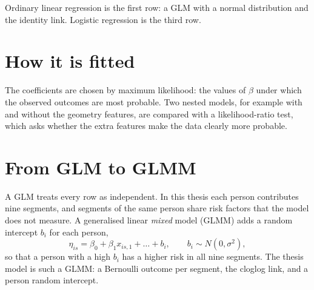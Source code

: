 \documentclass[11pt]{article}
\begin{document}
Ordinary linear regression is the first row: a GLM with a normal
distribution and the identity link. Logistic regression is the third row.

\section*{How it is fitted}

The coefficients are chosen by maximum likelihood: the values of $\beta$
under which the observed outcomes are most probable. Two nested models, for
example with and without the geometry features, are compared with a
likelihood-ratio test, which asks whether the extra features make the data
clearly more probable.

\section*{From GLM to GLMM}

A GLM treats every row as independent. In this thesis each person contributes
nine segments, and segments of the same person share risk factors that the
model does not measure. A generalised linear \emph{mixed} model (GLMM) adds a
random intercept $b_i$ for each person,
\[
  \eta_{is} = \beta_0 + \beta_1 x_{is,1} + \dots + b_i ,
  \qquad b_i \sim N(0, \sigma^2),
\]
so that a person with a high $b_i$ has a higher risk in all nine segments.
The thesis model is such a GLMM: a Bernoulli outcome per segment, the cloglog
link, and a person random intercept.
\end{document}

